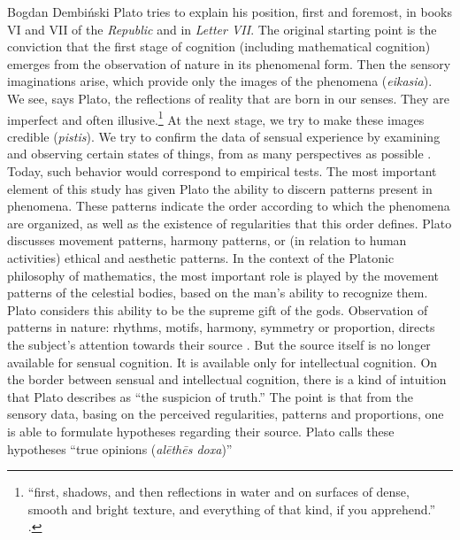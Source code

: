 \begin{artengenv}{Bogdan Dembiński}
Plato tries to explain his position, first and foremost, in books VI and VII of the \textit{Republic} and in
\textit{Letter VII}. The original starting point is the conviction that the first stage of cognition (including
mathematical cognition) emerges from the observation of nature in its phenomenal form. Then the sensory imaginations
arise, which provide only the images of the phenomena (\textit{eikasia}). We see, says Plato, the reflections of
reality that are born in our senses. They are imperfect and often illusive.\footnote{``first, shadows, and then
reflections in water and on surfaces of dense, smooth and bright texture, and everything of that kind, if you
apprehend.''
\parencite[\textit{Republic}, 510a]{plato_platonis_1955}.
} At the next stage, we try to make these images
credible (\textit{pistis}). We try to confirm the data of sensual experience by examining and observing certain states
of things, from as many perspectives as possible
\parencite[\textit{Republic}, 509d-511e]{plato_platonis_1955}.
Today,
such behavior would correspond to empirical tests. The most important element of this study %
has given Plato the ability to discern patterns present in phenomena. These patterns indicate the order according to
which the phenomena are organized, as well as the existence of regularities that this order defines. Plato
discusses movement patterns, harmony patterns, or (in relation to human activities) ethical and aesthetic patterns. In
the context of the Platonic philosophy of mathematics, the most important role is played by the movement patterns of
the celestial bodies, based on the man’s ability to recognize them. Plato considers this ability to be the supreme gift
of the gods. Observation of patterns in nature: rhythms, motifs, harmony, symmetry or proportion, directs the subject’s
attention towards their source
\parencite[\textit{Timaeus}, 47a-e]{plato_platonis_1955}.
But the source itself is no
longer available for sensual cognition. It is available only for intellectual cognition. On the border between sensual
and intellectual cognition, there is a kind of intuition that Plato describes as ``the suspicion of truth.'' The point is
that from the sensory data, basing on the perceived regularities, patterns and proportions, one is able to formulate
hypotheses regarding their source. Plato calls these hypotheses ``true opinions (\textit{al\=eth\=es doxa})''

\end{artengenv}
